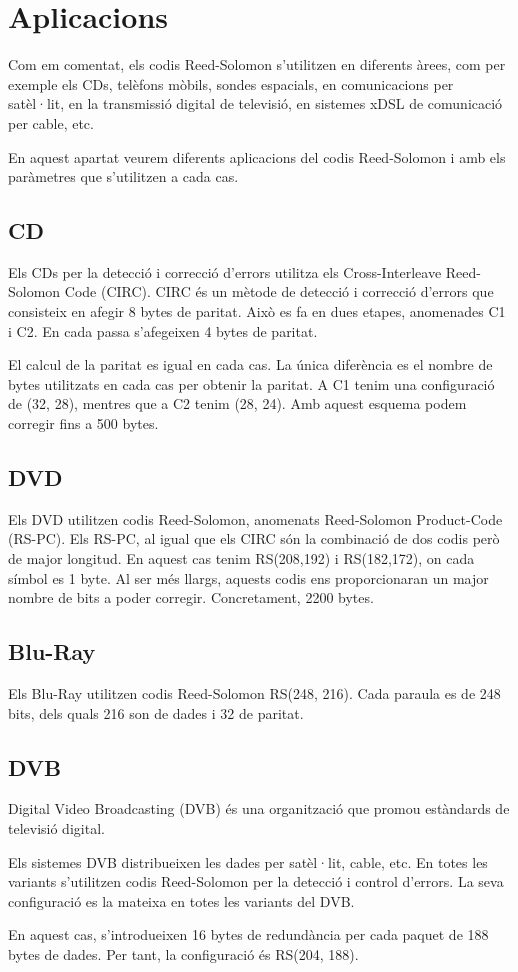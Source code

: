 \section{Aplicacions}
Com em comentat, els codis Reed-Solomon s'utilitzen en diferents àrees, com per
exemple els CDs, telèfons mòbils, sondes espacials, en comunicacions per
satèl·lit, en la transmissió digital de televisió, en sistemes xDSL de
comunicació per cable, etc.

En aquest apartat veurem diferents aplicacions del codis Reed-Solomon
i amb els paràmetres que s'utilitzen a cada cas. 

\subsection{CD}
Els CDs per la detecció i correcció d'errors utilitza els Cross-Interleave
Reed-Solomon Code (CIRC). CIRC és un mètode de detecció i correcció d'errors que
consisteix en afegir 8 bytes de paritat. Això es fa en dues etapes, anomenades
C1 i C2. En cada passa s'afegeixen 4 bytes de paritat. 

El calcul de la paritat es igual en cada cas. La única diferència es el nombre
de bytes utilitzats en cada cas per obtenir la paritat. A C1 tenim una
configuració de (32, 28), mentres que a C2 tenim (28, 24). Amb aquest esquema
podem corregir fins a 500 bytes. 

\subsection{DVD}
Els DVD utilitzen codis Reed-Solomon, anomenats Reed-Solomon Product-Code
(RS-PC). Els RS-PC, al igual que els CIRC són la combinació de dos codis però
de major longitud. En aquest cas tenim RS(208,192) i RS(182,172), on cada
símbol es 1 byte. Al ser més llargs, aquests codis ens proporcionaran un major
nombre de bits a poder corregir. Concretament, 2200 bytes. 
     
\subsection{Blu-Ray}
Els Blu-Ray utilitzen codis Reed-Solomon RS(248, 216). Cada paraula es de 248
bits, dels quals 216 son de dades i 32 de paritat.

\subsection{DVB}
Digital Video Broadcasting (DVB) és una organització que promou estàndards
de televisió digital. 

Els sistemes DVB distribueixen les dades per satèl·lit, cable, etc. En totes les
variants s'utilitzen codis Reed-Solomon per la detecció i control d'errors. La
seva configuració es la mateixa en totes les variants del DVB. 

En aquest cas, s'introdueixen 16 bytes de redundància per cada paquet de 188
bytes de dades. Per tant, la configuració és RS(204, 188). 

 